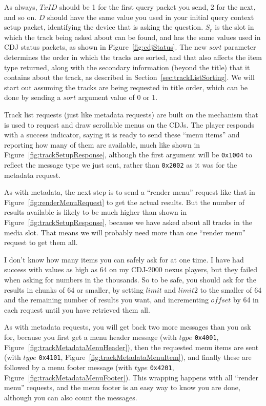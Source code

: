 \documentclass[11pt]{article}
\begin{document}
As always, $TxID$ should be 1 for the first query packet you send, 2
for the next, and so on. $D$ should have the same value you used in
your initial query context setup packet, identifying the device that
is asking the question. $S_r$ is the slot in which the track being
asked about can be found, and has the same values used in CDJ status
packets, as shown in Figure~\ref{fig:cdjStatus}. The new $sort$
parameter determines the order in which the tracks are sorted, and
that also affects the item type returned, along with the secondary
information (beyond the title) that it contains about the track, as
described in Section~\ref{sec:trackListSorting}. We will start out
assuming the tracks are being requested in title order, which can be
done by sending a $sort$ argument value of 0 or 1.

Track list requests (just like metadata requests) are built on the
mechanism that is used to request and draw scrollable menus on the
CDJs. The player responds with a success indicator, saying it is ready
to send these ``menu items'' and reporting how many of them are
available, much like shown in Figure~\ref{fig:trackSetupResponse},
although the first argument will be {\tt 0x1004} to reflect the
message type we just sent, rather than {\tt 0x2002} as it was for the
metadata request.

As with metadata, the next step is to send a ``render menu'' request
like that in Figure~\ref{fig:renderMenuRequest} to get the actual
results. But the number of results available is likely to be much
higher than shown in Figure~\ref{fig:trackSetupResponse}, because we
have asked about all tracks in the media slot. That means we will
probably need more than one ``render menu'' request to get them all.

I don't know how many items you can safely ask for at one time. I have
had success with values as high as 64 on my CDJ-2000 nexus players,
but they failed when asking for numbers in the thousands. So to be
safe, you should ask for the results in chunks of 64 or smaller, by
setting $limit$ and $limit2$ to the smaller of 64 and the remaining
number of results you want, and incrementing $offset$ by 64 in each
request until you have retrieved them all.

As with metadata requests, you will get back two more messages than
you ask for, because you first get a menu header message (with $type$
{\tt 0x4001}, Figure~\ref{fig:trackMetadataMenuHeader}), then the
requested menu items are sent (with $type$ {\tt 0x4101},
Figure~\ref{fig:trackMetadataMenuItem}), and finally these are
followed by a menu footer message (with $type$ {\tt 0x4201},
Figure~\ref{fig:trackMetadataMenuFooter}). This wrapping happens with
all ``render menu'' requests, and the menu footer is an easy way to
know you are done, although you can also count the messages.
\end{document}
